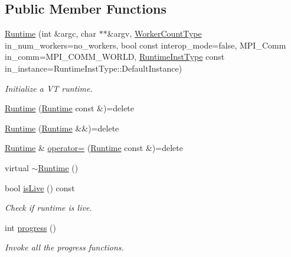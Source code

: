 \subsection*{Public Member Functions}
\begin{DoxyCompactItemize}
\item 
\hyperlink{structvt_1_1runtime_1_1_runtime_abc553df92056d67d5e500047a460f8a0}{Runtime} (int \&argc, char $\ast$$\ast$\&argv, \hyperlink{namespacevt_aa93398ea48f2cb6c188512250f7cc248}{Worker\+Count\+Type} in\+\_\+num\+\_\+workers=no\+\_\+workers, bool const interop\+\_\+mode=false, M\+P\+I\+\_\+\+Comm in\+\_\+comm=M\+P\+I\+\_\+\+C\+O\+M\+M\+\_\+\+W\+O\+R\+LD, \hyperlink{namespacevt_1_1runtime_afca910c1b38b3975f7c1da8001a77d58}{Runtime\+Inst\+Type} const in\+\_\+instance=Runtime\+Inst\+Type\+::\+Default\+Instance)
\begin{DoxyCompactList}\small\item\em Initialize a VT runtime. \end{DoxyCompactList}\item 
\hyperlink{structvt_1_1runtime_1_1_runtime_a42d87d965f2a283dbaf484b36b6a0c39}{Runtime} (\hyperlink{structvt_1_1runtime_1_1_runtime}{Runtime} const \&)=delete
\item 
\hyperlink{structvt_1_1runtime_1_1_runtime_a146708e42fa94f4d50bfdd6159f4d642}{Runtime} (\hyperlink{structvt_1_1runtime_1_1_runtime}{Runtime} \&\&)=delete
\item 
\hyperlink{structvt_1_1runtime_1_1_runtime}{Runtime} \& \hyperlink{structvt_1_1runtime_1_1_runtime_a30e1ddf6dd4950488044cf9608402193}{operator=} (\hyperlink{structvt_1_1runtime_1_1_runtime}{Runtime} const \&)=delete
\item 
virtual \hyperlink{structvt_1_1runtime_1_1_runtime_ae164ab301b823d985a62b7a5fb62cf07}{$\sim$\+Runtime} ()
\item 
bool \hyperlink{structvt_1_1runtime_1_1_runtime_a811947d9ba7322d0cb10c246200037c8}{is\+Live} () const
\begin{DoxyCompactList}\small\item\em Check if runtime is live. \end{DoxyCompactList}\item 
int \hyperlink{structvt_1_1runtime_1_1_runtime_a90748cf763f3e774934ee8c4b06a7303}{progress} ()
\begin{DoxyCompactList}\small\item\em Invoke all the progress functions. \end{DoxyCompactList}\item 
$$
\end{DoxyCompactItemize}
